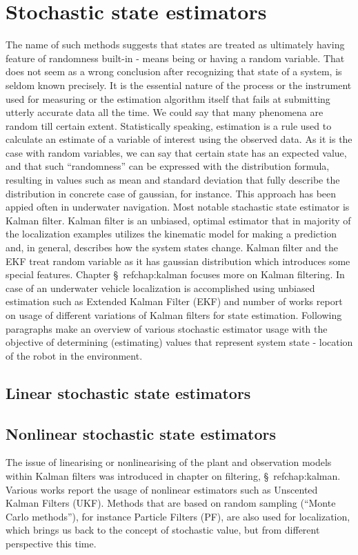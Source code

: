 \section{Stochastic state estimators}
The name of such methods suggests that states are treated as ultimately having feature of randomness built-in - means being or having a random variable. That does not seem as a wrong conclusion after recognizing that state of a system, is seldom known precisely. It is the essential nature of the process or the instrument used for measuring or the estimation algorithm itself that fails at submitting utterly accurate data all the time. We could say that many phenomena are random till certain extent. Statistically speaking, estimation is a rule used to calculate an estimate of a variable of interest using the observed data. As it is the case with random variables, we can say that certain state has an expected value, and that such ``randomness'' can be expressed with the distribution formula, resulting in values such as mean and standard deviation that fully describe the distribution in concrete case of gaussian, for instance. This approach has been appied often in underwater navigation. Most notable stachastic state estimator is Kalman filter. Kalman filter is an unbiased, optimal estimator that in majority of the localization examples utilizes the kinematic model for making a prediction and, in general, describes how the system states change. Kalman filter and the EKF treat random variable as it has gaussian distribution which introduces some special features. Chapter \S~ref{chap:kalman} focuses more on Kalman filtering. In case of an underwater vehicle localization is accomplished using unbiased estimation such as Extended Kalman Filter (EKF) and number of works report on usage of different variations of Kalman filters for state estimation. Following paragraphs make an overview of various stochastic estimator usage with the objective of determining (estimating) values that represent system state - location of the robot in the environment. 
	\subsection{Linear stochastic state estimators}
	\subsection{Nonlinear stochastic state estimators}
The issue of linearising or nonlinearising of the plant and observation models within Kalman filters was introduced in chapter on filtering, \S~ref{chap:kalman}. Various works report the usage of nonlinear estimators such as Unscented Kalman Filters (UKF). Methods that are based on random sampling (``Monte Carlo methods''), for instance Particle Filters (PF), are also used for localization, which brings us back to the concept of stochastic value, but from different perspective this time.
	

